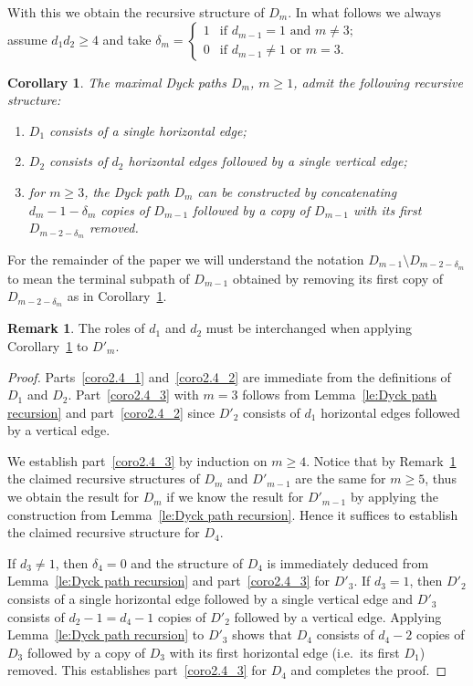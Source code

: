 \documentclass[10pt]{amsart}
\newtheorem{corollary}[theorem]{Corollary}
\theoremstyle{definition}
\newtheorem{remark}[theorem]{Remark}
\newcommand{\ie}{i.e.\ }
\begin{document}
With this we obtain the recursive structure of $D_m$. In what follows we always assume $d_1d_2\ge4$ and take $\delta_m=\begin{cases} 1 & \text{if $d_{m-1}=1$ and $m\ne3$;}\\ 0 & \text{if $d_{m-1}\ne1$ or $m=3$.}\end{cases}$
\begin{corollary}
 \label{cor:recursive dyck path structure}
 The maximal Dyck paths $D_m$, $m\ge1$, admit the following recursive structure:
 \begin{enumerate}[label=(\alph*)]
 \item\label{coro2.4_1} $D_1$ consists of a single horizontal edge;
 \item\label{coro2.4_2} $D_2$ consists of $d_2$ horizontal edges followed by a single vertical edge;
 \item\label{coro2.4_3} for $m\ge3$, the Dyck path $D_m$ can be constructed by concatenating $d_m-1-\delta_m$ copies of $D_{m-1}$ followed by a copy of $D_{m-1}$ with its first $D_{m-2-\delta_m}$ removed.
 \end{enumerate}
\end{corollary}
For the remainder of the paper we will understand the notation $D_{m-1}\setminus D_{m-2-\delta_m}$ to mean the terminal subpath of $D_{m-1}$ obtained by removing its first copy of $D_{m-2-\delta_m}$ as in Corollary~\ref{cor:recursive dyck path structure}.
\begin{remark}
 \label{rem:primed recursive structure}
 The roles of $d_1$ and $d_2$ must be interchanged when applying Corollary~\ref{cor:recursive dyck path structure} to $D'_m$.
\end{remark}
\begin{proof}
 Parts~\ref{coro2.4_1} and~\ref{coro2.4_2} are immediate from the definitions of $D_1$ and $D_2$. 
 Part~\ref{coro2.4_3} with $m=3$ follows from Lemma~\ref{le:Dyck path recursion} and part~\ref{coro2.4_2} since $D'_2$ consists of $d_1$ horizontal edges followed by a vertical edge. 

 We establish part~\ref{coro2.4_3} by induction on $m\ge4$. 
 Notice that by Remark~\ref{rem:primed recursive structure} the claimed recursive structures of $D_m$ and $D'_{m-1}$ are the same for $m\ge5$, thus we obtain the result for $D_m$ if we know the result for $D'_{m-1}$ by applying the construction from Lemma~\ref{le:Dyck path recursion}. 
 Hence it suffices to establish the claimed recursive structure for $D_4$. 

 If $d_3\ne1$, then $\delta_4=0$ and the structure of $D_4$ is immediately deduced from Lemma~\ref{le:Dyck path recursion} and part~\ref{coro2.4_3} for $D'_3$. 
 If $d_3=1$, then $D'_2$ consists of a single horizontal edge followed by a single vertical edge and $D'_3$ consists of $d_2-1=d_4-1$ copies of $D'_2$ followed by a vertical edge. 
 Applying Lemma~\ref{le:Dyck path recursion} to $D'_3$ shows that $D_4$ consists of $d_4-2$ copies of $D_3$ followed by a copy of $D_3$ with its first horizontal edge (\ie its first $D_1$) removed. 
 This establishes part~\ref{coro2.4_3} for $D_4$ and completes the proof.
\end{proof}
\end{document}
